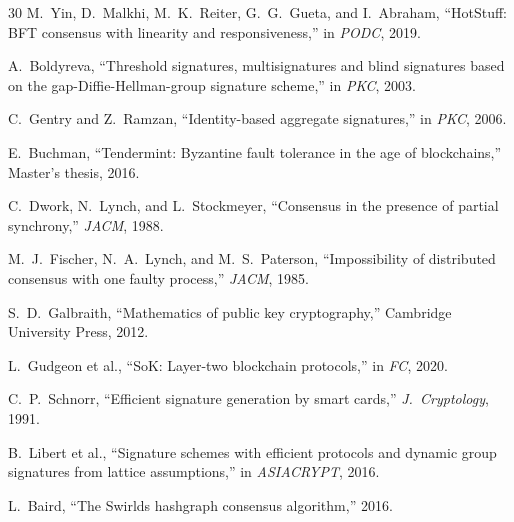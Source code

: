 \begin{thebibliography}{30}
M.~Yin, D.~Malkhi, M.~K.~Reiter, G.~G.~Gueta, and I.~Abraham, ``HotStuff: BFT consensus with linearity and responsiveness,'' in \emph{PODC}, 2019.

A.~Boldyreva, ``Threshold signatures, multisignatures and blind signatures based on the gap-Diffie-Hellman-group signature scheme,'' in \emph{PKC}, 2003.

C.~Gentry and Z.~Ramzan, ``Identity-based aggregate signatures,'' in \emph{PKC}, 2006.

E.~Buchman, ``Tendermint: Byzantine fault tolerance in the age of blockchains,'' Master's thesis, 2016.

C.~Dwork, N.~Lynch, and L.~Stockmeyer, ``Consensus in the presence of partial synchrony,'' \emph{JACM}, 1988.

M.~J.~Fischer, N.~A.~Lynch, and M.~S.~Paterson, ``Impossibility of distributed consensus with one faulty process,'' \emph{JACM}, 1985.

S.~D.~Galbraith, ``Mathematics of public key cryptography,'' Cambridge University Press, 2012.

L.~Gudgeon et al., ``SoK: Layer-two blockchain protocols,'' in \emph{FC}, 2020.

C.~P.~Schnorr, ``Efficient signature generation by smart cards,'' \emph{J.\ Cryptology}, 1991.

B.~Libert et al., ``Signature schemes with efficient protocols and dynamic group signatures from lattice assumptions,'' in \emph{ASIACRYPT}, 2016.

L.~Baird, ``The Swirlds hashgraph consensus algorithm,'' 2016.

\end{thebibliography}

